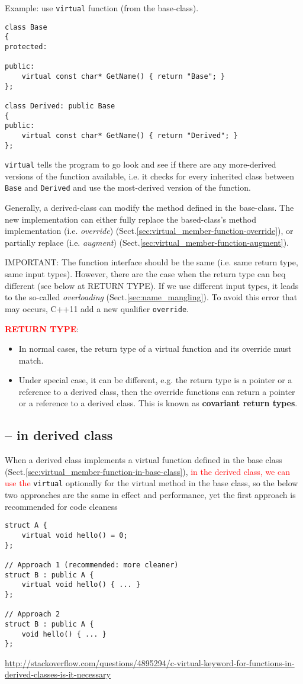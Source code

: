 Example: use \verb!virtual! function (from the base-class).
\begin{lstlisting}
class Base
{
protected:
 
public:
    virtual const char* GetName() { return "Base"; }
};
 
class Derived: public Base
{
public:
    virtual const char* GetName() { return "Derived"; }
};
\end{lstlisting}
\verb!virtual! tells the program to go look and see if there are any
more-derived versions of the function available, i.e. it checks for every
inherited class between \verb!Base! and \verb!Derived! and use the most-derived
version of the function.

Generally, a derived-class can modify the method defined in the base-class.
The new implementation can either fully replace the based-class's method
implementation (i.e. {\it override})
(Sect.\ref{sec:virtual_member-function-override}), or partially replace (i.e.
{\it augment}) (Sect.\ref{sec:virtual_member-function-augment}).

IMPORTANT: The function interface should be the same (i.e. same return type,
same input types). However, there are the case when the return type can beq
different (see below at RETURN TYPE). If we use different input types, it leads
to the so-called {\it overloading} (Sect.\ref{sec:name_mangling}). To avoid this
error that may occurs, C++11 add a new qualifier \verb!override!.

\textcolor{red}{\bf RETURN TYPE}:
\begin{itemize}
  \item In normal cases, the return type of a virtual function and its override
  must match.
  \item Under special case, it can be different, e.g. the return type is a
  pointer or a reference to a derived class, then the override functions can
  return a pointer or a reference to a derived class. This is known as {\bf
  covariant return types}.
\end{itemize}

\subsection{ -- in derived class}
\label{sec:virtual_member-function-derived-class}

When a derived class implements a virtual function defined in the base class
(Sect.\ref{sec:virtual_member-function-in-base-class}), \textcolor{red}{in the
derived class, we can use the } \verb!virtual! optionally for the virtual method
in the base class, so the below two approaches are the same in effect and
performance, yet the first approach is recommended for code cleaness
\begin{verbatim}
struct A {
    virtual void hello() = 0;
};

// Approach 1 (recommended: more cleaner)
struct B : public A {
    virtual void hello() { ... }
};

// Approach 2
struct B : public A {
    void hello() { ... }
};
\end{verbatim}
\url{http://stackoverflow.com/questions/4895294/c-virtual-keyword-for-functions-in-derived-classes-is-it-necessary}


